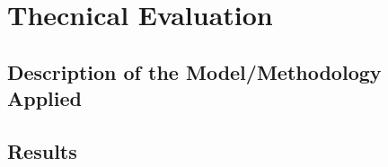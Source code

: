 \newpage
\chapter{Thecnical Evaluation}
\section{Description of the Model/Methodology Applied}
\section{Results}